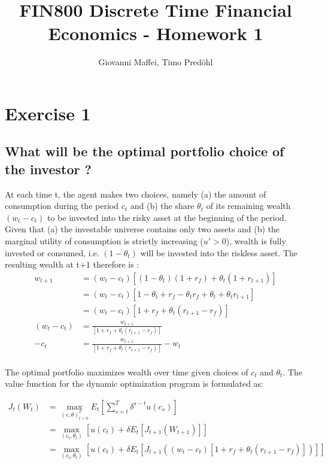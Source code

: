 \documentclass[]{article}
\title{FIN800 Discrete Time Financial Economics - Homework 1}
\author{Giovanni Maffei, Timo Predöhl}
\begin{document}
\maketitle

\section{Exercise 1}

\subsection{What will be the optimal portfolio choice of the investor ?}
At each time t, the agent makes two choices, namely (a) the amount of consumption during the period $c_t$ and (b) the share $\theta_t$ of its remaining wealth $(w_t - c_t)$ to be invested into the risky asset at the beginning of the period. Given that (a) the investable universe contains only two assets and (b) the marginal utility of consumption is strictly increasing ($u'>0$), wealth is fully invested or consumed, i.e. $(1-\theta_t)$ will be invested into the riskless asset. The resulting wealth at t+1 therefore is :
\begin{align*}
	w_{t+1} &= (w_t - c_t)\left[(1-\theta_t)(1+r_f)+ \theta_t(1+r_{t+1}) \right]\\
	&= (w_t - c_t) \left[1 -\theta_t + r_f - \theta_t r_f + \theta_t + \theta_t r_{t+1}\right]\\
	&= (w_t - c_t) \left[1 + r_f + \theta_t(r_{t+1}-r_f) \right]\\
	(w_t - c_t) &= \frac{w_{t+1}}{\left[1 + r_f + \theta_t(r_{t+1}-r_f) \right]}\\
	-c_t &= \frac{w_{t+1}}{\left[1 + r_f + \theta_t(r_{t+1}-r_f) \right]} - w_t\\
\end{align*}



The optimal portfolio maximizes wealth over time given choices of $c_t$ and $\theta_t$. The value function for the dynamic optimization program is formulated as:

\begin{align*}
	J_t(W_t) &= \max_{(c, \theta)_{t=0}^T} E_t \left[\sum_{s=t}^{T} \delta^{s-t}u(c_s)\right]\\
	&= \max_{(c_t, \theta_t)} \left[u(c_t) + \delta E_t\left[J_{t+1}(W_{t+1})\right]\right]\\
	&= \max_{(c_t, \theta_t)} \left[u(c_t) + \delta E_t\left[J_{t+1}((w_t - c_t) \left[1 + r_f + \theta_t(r_{t+1}-r_f) \right])\right]\right]
\end{align*}
\end{document}
